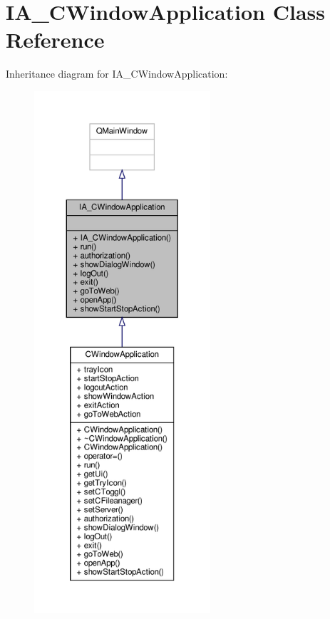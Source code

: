 \hypertarget{classIA__CWindowApplication}{}\section{I\+A\+\_\+\+C\+Window\+Application Class Reference}
\label{classIA__CWindowApplication}


Inheritance diagram for I\+A\+\_\+\+C\+Window\+Application\+:
\nopagebreak
\begin{figure}[H]
\begin{center}
\leavevmode
\includegraphics[height=550pt]{classIA__CWindowApplication__inherit__graph}
\end{center}
\end{figure}



